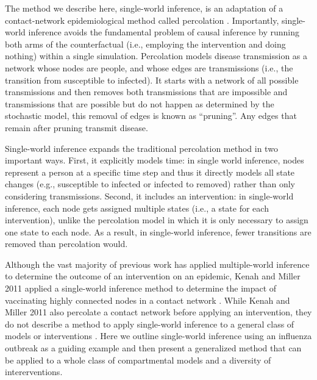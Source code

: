 \documentclass[PTRSB]{rsos}
\begin{document}
The method we describe here, single-world inference, is an adaptation of a contact-network epidemiological method called percolation \cite{miller-book}.
Importantly, single-world inference avoids the fundamental problem of causal inference by running both arms of the counterfactual (i.e., employing the intervention and doing nothing) within a single simulation.
Percolation models disease transmission as a network whose nodes are people, and whose edges are transmissions (i.e., the transition from susceptible to infected).
It starts with a network of all possible transmissions and then removes both transmissions that are impossible and transmissions that are possible but do not happen as determined by the stochastic model, this removal of edges is known as ``pruning''.
Any edges that remain after pruning transmit disease.

Single-world inference expands the traditional percolation method in two important ways.
First, it explicitly models time: in single world inference, nodes represent a person at a specific time step and thus it directly models all state changes (e.g., susceptible to infected or infected to removed) rather than only considering transmissions.
Second, it includes an intervention: in single-world inference, each node gets assigned multiple states (i.e., a state for each intervention), unlike the percolation model in which it is only necessary to assign one state to each node.
As a result, in single-world inference, fewer transitions are removed than percolation would.

Although the vast majority of previous work has applied multiple-world inference to determine the outcome of an intervention on an epidemic, Kenah and Miller 2011 applied a single-world inference method to determine the impact of vaccinating highly connected nodes in a contact network \cite{kenah-miller:2011}.
While Kenah and Miller 2011 also percolate a contact network before applying an intervention, they do not describe a method to apply single-world inference to a general class of models or interventions \cite{kenah-miller:2011}.
Here we outline single-world inference using an influenza outbreak as a guiding example and then present a generalized method that can be applied to a whole class of compartmental models and a diversity of intererventions.
\end{document}
